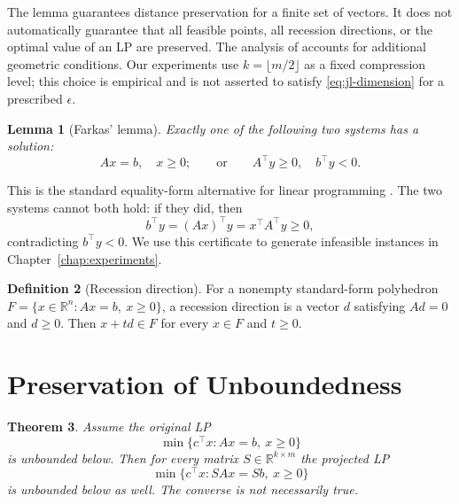 \documentclass[12pt,letterpaper,oneside]{report}
\newtheorem{theorem}{Theorem}[section]
\newtheorem{lemma}[theorem]{Lemma}
\theoremstyle{definition}
\newtheorem{definition}[theorem]{Definition}
\newcommand{\R}{\mathbb{R}}
\begin{document}
The lemma guarantees distance preservation for a finite set of vectors.
It does not automatically guarantee that all feasible points, all
recession directions, or the optimal value of an LP are preserved.
The analysis of \cite{vu2018} accounts for additional geometric
conditions. Our experiments use $k=\lfloor m/2\rfloor$ as a fixed
compression level; this choice is empirical and is not asserted to satisfy
\eqref{eq:jl-dimension} for a prescribed $\epsilon$.

\begin{lemma}[Farkas' lemma]\label{lem:farkas}
Exactly one of the following two systems has a solution:
\[
Ax=b,\quad x\geq0;
\qquad\text{or}\qquad
A^\top y\geq0,\quad b^\top y<0.
\]
\end{lemma}
This is the standard equality-form alternative for linear programming
\cite{vanderbei2020}. The two systems cannot both hold: if they did, then
\[
b^\top y=(Ax)^\top y=x^\top A^\top y\geq0,
\]
contradicting $b^\top y<0$. We use this certificate to generate infeasible
instances in Chapter~\ref{chap:experiments}.

\begin{definition}[Recession direction]
For a nonempty standard-form polyhedron
$F=\{x\in\R^n:Ax=b,\ x\geq0\}$, a recession direction is a vector
$d$ satisfying $Ad=0$ and $d\geq0$. Then $x+td\in F$ for every
$x\in F$ and $t\geq0$.
\end{definition}

\section{Preservation of Unboundedness}
\begin{theorem}\label{thm:unbounded}
Assume the original LP
\[
\min\{c^\top x:Ax=b,\ x\geq0\}
\]
is unbounded below. Then for every matrix $S\in\R^{k\times m}$ the
projected LP
\[
\min\{c^\top x:SAx=Sb,\ x\geq0\}
\]
is unbounded below as well. The converse is not necessarily true.
\end{theorem}
\end{document}
